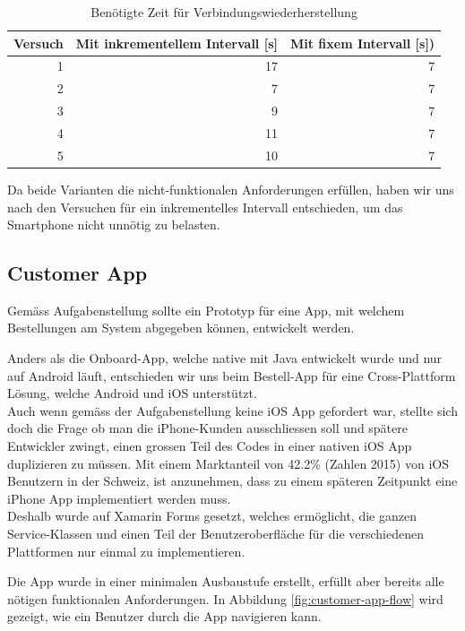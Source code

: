 \begin{table}
	
	\centering
	\begin{tabular}{|r|r|r|}
		\hline
		\textbf{Versuch} & \textbf{Mit inkrementellem Intervall [s] } & \textbf{Mit fixem Intervall [s])} \\
		\hline
		1 & 17 & 7 \\
		2 &	7 & 7 \\
		3 & 9 & 7 \\
 		4 & 11 & 7 \\
		5 & 10 & 7 \\
		\hline
	\end{tabular}
	\caption{Benötigte Zeit für Verbindungswiederherstellung}
	\label{tbl:backoff}
\end{table}

Da beide Varianten die nicht-funktionalen Anforderungen erfüllen, haben wir uns nach den Versuchen für ein inkrementelles Intervall entschieden, um das Smartphone nicht unnötig zu belasten.

\subsection{Customer App}
Gemäss Aufgabenstellung sollte ein Prototyp für eine App, mit welchem Bestellungen am System abgegeben können, entwickelt werden.

Anders als die Onboard-App, welche native mit Java entwickelt wurde und nur auf Android läuft, entschieden wir uns beim Bestell-App für eine Cross-Plattform Lösung, welche Android und iOS unterstützt. \\

Auch wenn gemäss der Aufgabenstellung keine iOS App gefordert war, stellte sich doch die Frage ob man die iPhone-Kunden ausschliessen soll und spätere Entwickler zwingt, einen grossen Teil des Codes in einer nativen iOS App duplizieren zu müssen. Mit einem Marktanteil von 42.2\% (Zahlen 2015) \cite{ios-user} von iOS Benutzern in der Schweiz, ist anzunehmen, dass zu einem späteren Zeitpunkt eine iPhone App implementiert werden muss.\\

Deshalb wurde auf Xamarin Forms gesetzt, welches ermöglicht, die ganzen Service-Klassen und einen Teil der Benutzeroberfläche für die verschiedenen Plattformen nur einmal zu implementieren.

Die App wurde in einer minimalen Ausbaustufe erstellt, erfüllt aber bereits alle nötigen funktionalen Anforderungen. In Abbildung \ref{fig:customer-app-flow} wird gezeigt, wie ein Benutzer durch die App navigieren kann. 

